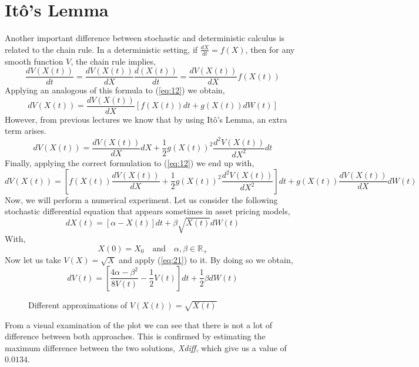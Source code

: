 \documentclass[12pt,a4paper]{article}
\def\a{\alpha}
\def\b{\beta}
\begin{document}
\section{It\^{o}'s Lemma}
Another important difference between stochastic and deterministic calculus is related to the chain rule. In a deterministic setting, if $\frac{dX}{dt}=f(X)$, then for any smooth function $V$, the chain rule implies,
\begin{equation} \label{eq:18}
\frac{dV\left(X(t)\right)}{dt}=\frac{dV\left(X(t)\right)}{dX}\frac{d\left(X(t)\right)}{dt}=\frac{dV\left(X(t)\right)}{dX}f\left(X(t)\right)
\end{equation}
Applying an analogous of this formula to (\ref{eq:12}) we obtain, 
\begin{equation} \label{eq:19}
dV\left(X(t)\right)=\frac{dV\left(X(t)\right)}{dX}\left[f\left(X(t)\right)dt+g\left(X(t)\right)dW(t)\right]
\end{equation}
However, from previous lectures we know that by using It\^{o}'s Lemma, an extra term arises. 
\begin{equation} \label{eq:20}
dV\left(X(t)\right)=\frac{dV\left(X(t)\right)}{dX}dX+\frac{1}{2}g\left(X(t)\right)^2\frac{d^2V\left(X(t)\right)}{dX^2}dt
\end{equation}
Finally, applying the correct formulation to (\ref{eq:12}) we end up with, 
\begin{equation} \label{eq:21}
dV\left(X(t)\right)=\left[f\left(X(t)\right)\frac{dV\left(X(t)\right)}{dX}+\frac{1}{2}g\left(X(t)\right)^2\frac{d^2V\left(X(t)\right)}{dX^2}\right]dt+g\left(X(t)\right)\frac{dV\left(X(t)\right)}{dX}dW(t)
\end{equation}
Now, we will perform a numerical experiment. Let us consider the following stochastic differential equation that appears sometimes in asset pricing models, 
\begin{equation} \label{eq:22}
dX(t)=\left[\a-X(t)\right]dt+\b \sqrt{X(t)}dW(t)
\end{equation}
With, $$X(0)=X_0 \quad \text{and} \quad \a,\b \in \mathbb{R}_+$$
Now let us take $V(X)=\sqrt{X}$ and apply (\ref{eq:21}) to it. By doing so we obtain, 
\begin{equation} \label{eq:23}
dV(t)=\left[\frac{4\a -\b^2}{8V(t)}-\frac{1}{2}V(t)\right]dt+\frac{1}{2}\b dW(t)
\end{equation}

\begin{figure}[H]
\caption{Different approximations of $V(X(t))=\sqrt{X(t)}$}  \label{fig:fig4}
\begin{center}
\end{center}
\end{figure}
\noindent From a visual examination of the plot we can see that there is not a lot of difference between both approaches. This is confirmed by estimating the maximum difference between the two solutions, \textsl{Xdiff}, which give us a value of $0.0134$. 
\end{document}
